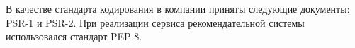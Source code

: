 В качестве стандарта кодирования в компании приняты следующие документы: PSR-1
и PSR-2. При реализации сервиса рекомендательной системы использовался
стандарт PEP 8.
